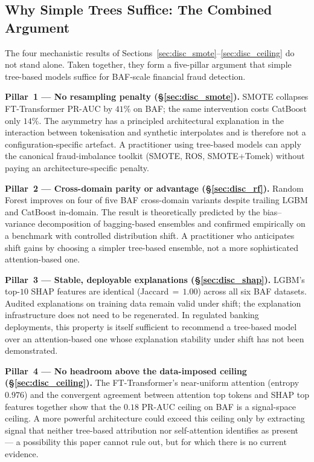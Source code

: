 \documentclass[a4paper,fleqn]{cas-sc}
\begin{document}
\subsection{Why Simple Trees Suffice: The Combined Argument}
\label{sec:disc_suffice}

The four mechanistic results of Sections~\ref{sec:disc_smote}--\ref{sec:disc_ceiling}
do not stand alone.
Taken together, they form a five-pillar argument that simple tree-based models
suffice for BAF-scale financial fraud detection.

\textbf{Pillar~1 --- No resampling penalty (\S\ref{sec:disc_smote}).}
SMOTE collapses FT-Transformer PR-AUC by $41\%$ on BAF; the same intervention
costs CatBoost only $14\%$.
The asymmetry has a principled architectural explanation in the interaction
between tokenisation and synthetic interpolates and is therefore not a
configuration-specific artefact.
A practitioner using tree-based models can apply the canonical fraud-imbalance
toolkit (SMOTE, ROS, SMOTE+Tomek) without paying an architecture-specific
penalty.

\textbf{Pillar~2 --- Cross-domain parity or advantage (\S\ref{sec:disc_rf}).}
Random Forest improves on four of five BAF cross-domain variants despite
trailing LGBM and CatBoost in-domain.
The result is theoretically predicted by the bias--variance decomposition of
bagging-based ensembles and confirmed empirically on a benchmark with
controlled distribution shift.
A practitioner who anticipates shift gains by choosing a simpler tree-based
ensemble, not a more sophisticated attention-based one.

\textbf{Pillar~3 --- Stable, deployable explanations (\S\ref{sec:disc_shap}).}
LGBM's top-$10$ SHAP features are identical (Jaccard\,$=\,1.00$) across all
six BAF datasets.
Audited explanations on training data remain valid under shift; the
explanation infrastructure does not need to be regenerated.
In regulated banking deployments, this property is itself sufficient to
recommend a tree-based model over an attention-based one whose explanation
stability under shift has not been demonstrated.

\textbf{Pillar~4 --- No headroom above the data-imposed ceiling
(\S\ref{sec:disc_ceiling}).}
The FT-Transformer's near-uniform attention (entropy $0.976$) and the
convergent agreement between attention top tokens and SHAP top features
together show that the $0.18$ PR-AUC ceiling on BAF is a signal-space
ceiling.
A more powerful architecture could exceed this ceiling only by extracting
signal that neither tree-based attribution nor self-attention identifies
as present --- a possibility this paper cannot rule out, but for which there
is no current evidence.
\end{document}
